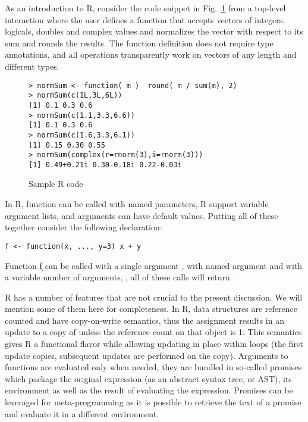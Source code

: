 \documentclass[acmsmall,review,anonymous]{acmart}\settopmatter{printfolios=true,printccs=false,printacmref=false}
\newcommand{\code}[1]{\text{\lstinline[basicstyle=\ttfamily\smaller]~#1~}}
\begin{document}
As an introduction to R, consider the code snippet in Fig.~\ref{sample} from
a top-level interaction where the user defines a function \code{normSum}
that accepts vectors of integers, logicals, doubles and complex values and
normalizes the vector with respect to its sum and rounds the results. The
function definition does not require type annotations, and all operations
transparently work on vectors of any length and different types.

\begin{figure}[!hb]{\small
\begin{lstlisting}
> normSum <- function( m )  round( m / sum(m), 2)
> normSum(c(1L,3L,6L))
[1] 0.1 0.3 0.6
> normSum(c(1.1,3.3,6.6))
[1] 0.1 0.3 0.6
> normSum(c(1.6,3.3,6.1))
[1] 0.15 0.30 0.55
> normSum(complex(r=rnorm(3),i=rnorm(3)))
[1] 0.49+0.21i 0.30-0.18i 0.22-0.03i
\end{lstlisting}}
\caption{Sample R code}\label{sample}
\end{figure}

In R, function can be called with named parameters, R support variable
argument lists, and arguments can have default values. Putting all of these
together consider the following declaration:

\begin{lstlisting}
f <- function(x, ..., y=3) x + y
\end{lstlisting}

\noindent
Function \k{f} can be called with a single argument \code{f(3)}, with named
argument \code{f(y=4,x=2)} and with a variable number of arguments,
\code{f(1,2,3,4,y=5)}, all of these calls will return \code{6}.

R has a number of features that are not crucial to the present
discussion. We will mention some of them here for completeness.  In R, data
structures are reference counted and have copy-on-write semantics, thus the
assignment \code{x[12]<-3} results in an update to a copy of \code{x} unless
the reference count on that object is 1.  This semantics gives R a
functional flavor while allowing updating in place within loops (the first
update copies, subsequent updates are performed on the copy). Arguments to
functions are evaluated only when needed, they are bundled in so-called
promises which package the original expression (as an abstract syntax tree, or AST), its environment
as well as the result of evaluating the expression. Promises can be
leveraged for meta-programming as it is possible to retrieve the text of a
promise and evaluate it in a different environment.
\end{document}
